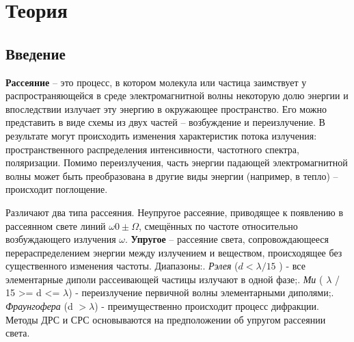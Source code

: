 \documentclass[a4paper,10pt]{article}
\begin{document}
\section{Теория}
\subsection{Введение}
\textbf{Рассеяние} – это процесс, в котором молекула или частица заимствует у распространяющейся в среде электромагнитной волны некоторую долю энергии и впоследствии излучает эту энергию в окружающее пространство. Его можно представить в виде схемы из двух частей – возбуждение и переизлучение.
В результате могут происходить изменения характеристик потока излучения: пространственного распределения интенсивности, частотного спектра, поляризации. Помимо переизлучения, часть энергии падающей электромагнитной волны может быть преобразована в другие виды энергии (например, в тепло) – происходит поглощение.

Различают два типа рассеяния.
Неупругое рассеяние, приводящее к появлению в рассеянном свете линий $\omega0 \pm \Omega$, смещённых по частоте относительно возбуждающего излучения $\omega$. \textbf{Упругое} – рассеяние света, сопровождающееся перераспределением энергии
между излучением и веществом, происходящее без существенного изменения частоты. 
Диапазоны:. \textit{Рэлея} ($d < \lambda / 15 $ ) - все элементарные диполи рассеивающей частицы излучают в одной фазе;. \textit{Ми} ( $\lambda$ / 15 >= d <= $\lambda $) - переизлучение первичной
волны элементарными диполями;. \textit{Фраунгофера} (d $> \lambda$) - преимущественно происходит процесс дифракции.
Методы ДРС и СРС основываются на предположении об упругом рассеянии света.


\end{document}
